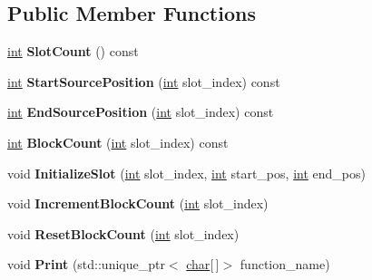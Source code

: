 \subsection*{Public Member Functions}
\begin{DoxyCompactItemize}
\item 
\mbox{\label{classv8_1_1internal_1_1CoverageInfo_a640e41606bf105121ef0c82a001f571a}} 
\mbox{\hyperlink{classint}{int}} {\bfseries Slot\+Count} () const
\item 
\mbox{\label{classv8_1_1internal_1_1CoverageInfo_a170f294c642adcde5dd46e9691321f71}} 
\mbox{\hyperlink{classint}{int}} {\bfseries Start\+Source\+Position} (\mbox{\hyperlink{classint}{int}} slot\+\_\+index) const
\item 
\mbox{\label{classv8_1_1internal_1_1CoverageInfo_a6266b4a243a230097e6ef3e0437497fb}} 
\mbox{\hyperlink{classint}{int}} {\bfseries End\+Source\+Position} (\mbox{\hyperlink{classint}{int}} slot\+\_\+index) const
\item 
\mbox{\label{classv8_1_1internal_1_1CoverageInfo_a0dd1fb30a70a0571f5544638fc5c6d22}} 
\mbox{\hyperlink{classint}{int}} {\bfseries Block\+Count} (\mbox{\hyperlink{classint}{int}} slot\+\_\+index) const
\item 
\mbox{\label{classv8_1_1internal_1_1CoverageInfo_a4d82c1b9cc5946e0b3ed6f2337405b26}} 
void {\bfseries Initialize\+Slot} (\mbox{\hyperlink{classint}{int}} slot\+\_\+index, \mbox{\hyperlink{classint}{int}} start\+\_\+pos, \mbox{\hyperlink{classint}{int}} end\+\_\+pos)
\item 
\mbox{\label{classv8_1_1internal_1_1CoverageInfo_af8a7ae7265e5ea833d9c6faba7793af3}} 
void {\bfseries Increment\+Block\+Count} (\mbox{\hyperlink{classint}{int}} slot\+\_\+index)
\item 
\mbox{\label{classv8_1_1internal_1_1CoverageInfo_a77c4de3ad62a2e28cec77a645b8e7f0d}} 
void {\bfseries Reset\+Block\+Count} (\mbox{\hyperlink{classint}{int}} slot\+\_\+index)
\item 
\mbox{\label{classv8_1_1internal_1_1CoverageInfo_ad2f3fce4ab5381b79a52122074848d87}} 
void {\bfseries Print} (std\+::unique\+\_\+ptr$<$ \mbox{\hyperlink{classchar}{char}}\mbox{[}$\,$\mbox{]}$>$ function\+\_\+name)
\end{DoxyCompactItemize}
